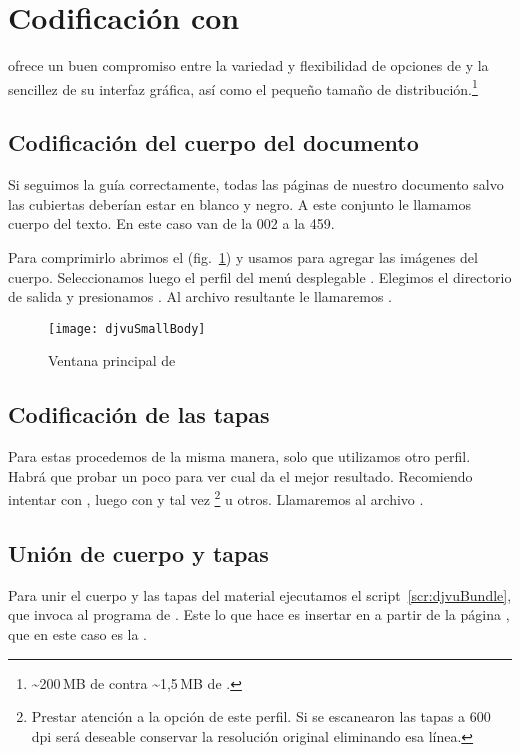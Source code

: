 \documentclass[%
	a5paper,
	10pt,
	twoside,
	openright,
	final,
]{memoir}
\begin{document}
	\section{Codificación con \djvusmall\label{sec:djvuSmall}} \djvusmall ofrece un buen compromiso entre la variedad y flexibilidad de opciones de \dexpress y la sencillez de su interfaz gráfica, así como el pequeño tamaño de distribución.\footnote{\textasciitilde 200\,MB de \dexpress contra \textasciitilde 1,5\,MB de \djvusmall.}

	\subsection{Codificación del cuerpo del documento\label{sec:djvuSmallBody}} Si seguimos la guía correctamente, todas las páginas de nuestro documento salvo las cubiertas deberían estar en blanco y negro. A este conjunto le llamamos cuerpo del texto. En este caso van de la 002 a la 459.

	Para comprimirlo abrimos el \djvusmall (fig.~\ref{fig:djvuSmallBody}) y usamos  para agregar las imágenes del cuerpo. Seleccionamos luego el perfil  del menú desplegable . Elegimos el directorio de salida y presionamos . Al archivo resultante le llamaremos .

	\begin{figure}
		\texttt{[image: djvuSmallBody]}
		\caption{Ventana principal de \djvusmall\label{fig:djvuSmallBody}}
	\end{figure}

	\subsection{Codificación de las tapas\label{sec:djvuSmallCovers}} Para estas procedemos de la misma manera, solo que utilizamos otro perfil. Habrá que probar un poco para ver cual da el mejor resultado. Recomiendo intentar con , luego con  y tal vez \footnote{Prestar atención a la opción  de este perfil. Si se escanearon las tapas a 600\,dpi será deseable conservar la resolución original eliminando esa línea.} u otros. Llamaremos al archivo .

	\subsection{Unión de cuerpo y tapas} Para unir el cuerpo y las tapas del material ejecutamos el script~\ref{scr:djvuBundle}, que invoca al programa  de \djvulibre. Este lo que hace es insertar  en  a partir de la página , que en este caso es la .
\end{document}
